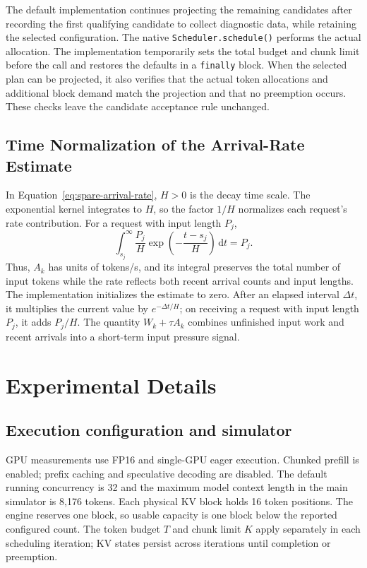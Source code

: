The default implementation continues projecting the remaining candidates after recording the first qualifying candidate to collect diagnostic data, while retaining the selected configuration. The native \texttt{Scheduler.schedule()} performs the actual allocation. The implementation temporarily sets the total budget and chunk limit before the call and restores the defaults in a \texttt{finally} block. When the selected plan can be projected, it also verifies that the actual token allocations and additional block demand match the projection and that no preemption occurs. These checks leave the candidate acceptance rule unchanged.

\subsection{Time Normalization of the Arrival-Rate Estimate}
\label{app:spare-normalization}

In Equation~\eqref{eq:spare-arrival-rate}, $H>0$ is the decay time scale. The exponential kernel integrates to $H$, so the factor $1/H$ normalizes each request's rate contribution. For a request with input length $P_j$,
\begin{equation*}
\int_{s_j}^{\infty}\frac{P_j}{H}
\exp\!\left(-\frac{t-s_j}{H}\right)\,\mathrm dt=P_j.
\end{equation*}
Thus, $A_k$ has units of tokens/s, and its integral preserves the total number of input tokens while the rate reflects both recent arrival counts and input lengths. The implementation initializes the estimate to zero. After an elapsed interval $\Delta t$, it multiplies the current value by $e^{-\Delta t/H}$; on receiving a request with input length $P_j$, it adds $P_j/H$. The quantity $W_k+\tau A_k$ combines unfinished input work and recent arrivals into a short-term input pressure signal.

\section{Experimental Details}
\label{app:experimental-details}


\subsection{Execution configuration and simulator}
\label{app:experimental-simulator}

GPU measurements use FP16 and single-GPU eager execution. Chunked prefill is enabled; prefix caching and speculative decoding are disabled. The default running concurrency is 32 and the maximum model context length in the main simulator is 8,176 tokens. Each physical KV block holds 16 token positions. The engine reserves one block, so usable capacity is one block below the reported configured count. The token budget $T$ and chunk limit $K$ apply separately in each scheduling iteration; KV states persist across iterations until completion or preemption.

